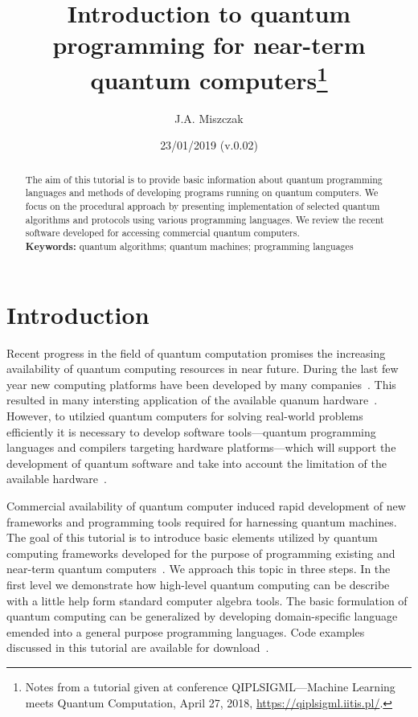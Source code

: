\documentclass[a4paper,11pt]{article}
\newcommand{\docName}{tutorial\xspace}
\begin{document}
\title{Introduction to quantum programming for near-term quantum 
computers\footnote{Notes from a tutorial given 
at conference QIPLSIGML---Machine Learning meets Quantum Computation, April 27, 
2018, \url{https://qiplsigml.iitis.pl/}.}}
\author{J.A. Miszczak}
\date{23/01/2019 (v.0.02)}

\maketitle

\begin{abstract}
The aim of this \docName is to provide basic information about quantum
programming languages and methods of developing programs running on quantum
computers. We focus on the procedural approach by presenting implementation
of selected quantum algorithms and protocols using various programming
languages. We review the recent software developed for accessing commercial
quantum computers.\\[6pt]
\textbf{Keywords:} quantum algorithms; quantum machines; programming languages
\end{abstract}

\section{Introduction}
Recent progress in the field of quantum computation promises the increasing 
availability of quantum computing resources in near future. During the last few 
year new computing platforms have been developed by many 
companies~\cite{ibm-quantumexperience}. This resulted in many intersting 
application of the available quanum hardware~\cite{xandu-pennylane}. 
However, to utilzied quantum computers for solving real-world problems 
efficiently it is necessary to develop software tools---quantum programming 
languages and compilers targeting hardware platforms---which will support the 
development of quantum software and take into account the limitation of the 
available hardware~\cite{chong2017programming}.

Commercial availability of quantum computer induced rapid development of new 
frameworks and programming tools required for harnessing quantum machines. 
The goal of this \docName is to introduce basic elements utilized by quantum 
computing frameworks developed for the purpose of programming existing and 
near-term quantum  computers~\cite{preskill2018quantum,ibm-qiskit-aqua}. We 
approach this topic in three steps. In the first level we demonstrate how 
high-level quantum computing can be describe with a little help form standard 
computer algebra tools. The basic formulation of quantum computing can be 
generalized by developing domain-specific language emended into a general 
purpose programming languages. Code examples discussed in this \docName are 
available for download~\cite{qprog-tutor}.
\end{document}
